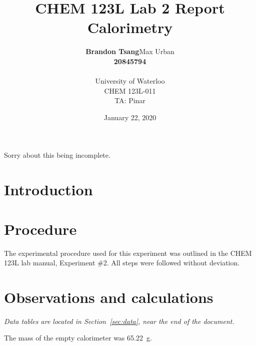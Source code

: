 \documentclass[11pt, titlepage]{article}
\title{
    CHEM 123L Lab 2 Report \\
    \Large Calorimetry
}
\author{
    \begin{tabular}{c c}
        \textbf{Brandon Tsang} & Max Urban \\
        \small{\textbf{20845794}} &
    \end{tabular} \\[20pt]
    University of Waterloo \\
    CHEM 123L-011 \\
    TA: Pinar
}
\date{January 22, 2020}
\begin{document}
    \maketitle
    \noindent
    Sorry about this being incomplete.
    \section{Introduction}
    \section{Procedure}
        The experimental procedure used for this experiment was outlined in the CHEM 123L lab manual, Experiment \#2. All steps were followed without deviation.
    \section{Observations and calculations}
        \textit{Data tables are located in Section~\ref{sec:data}, near the end of the document.}
        \par\noindent
        The mass of the empty calorimeter was \SI{65.22}{\gram}.
\end{document}
